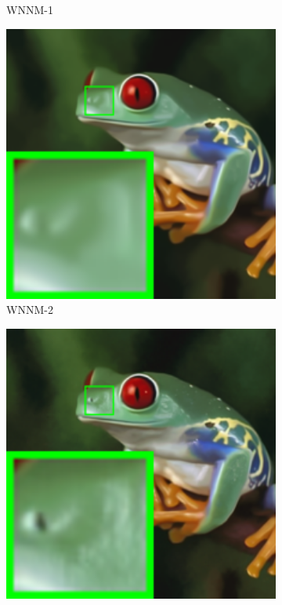 \begin{figure}
\begin{subfigure}[t]{0.19\textwidth}
		\caption{WNNM-1}
    \end{subfigure}
    \hfill
    \begin{subfigure}[t]{0.19\textwidth}
        \centering
        \includegraphics[width=1\textwidth]{images/mcwnnm/nc/resize_br_WNNMJ_frog.png}
		\caption{WNNM-2}
    \end{subfigure}
    \hfill
    \begin{subfigure}[t]{0.19\textwidth}
        \centering
        \includegraphics[width=1\textwidth]{images/mcwnnm/nc/resize_br_WNNM_ADMM_frog.png}

\end{subfigure}
\end{figure}
